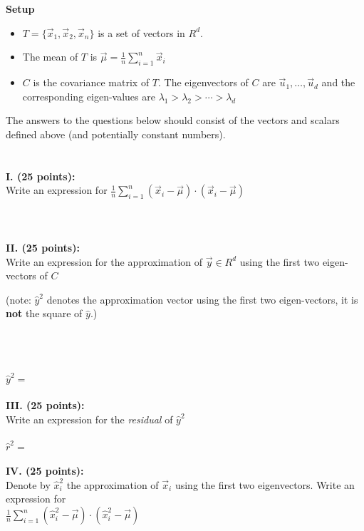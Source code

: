 \documentclass[10pt]{article}
\begin{document}
\newcommand{\uu}{\vec{u}}
\newcommand{\xx}{\vec{x}}
\newcommand{\yy}{\vec{y}}
\newcommand{\vmu}{\vec{\mu}}
~\\
~\\
\vspace{.1in}
\noindent
    {\bf Setup}
    \begin{itemize}
    \item $T=\{\xx_1,\xx_2,\xx_n\}$ is a set of vectors in $R^d$.
    \item The mean of $T$ is $\vmu = \frac{1}{n} \sum_{i=1}^n\xx_i$
    \item $C$ is the covariance matrix of $T$. The eigenvectors of $C$
      are $\uu_1,\ldots,\uu_d$ and the corresponding eigen-values are
      $\lambda_1 > \lambda_2 > \cdots > \lambda_d$
    \end{itemize}
    The answers to the questions below should consist of the vectors
    and scalars defined above (and potentially constant numbers).\\
    ~\\
    ~\\
\noindent
    {\bf I. (25 points):} \\
    Write an expression for $\frac{1}{n} \sum_{i=1}^n (\xx_i - \vmu)\cdot(\xx_i -
    \vmu)$ \\
~\\
~\\
\underline{\hspace{6in}}\\
\vspace{.1in}
\noindent
    {\bf II. (25 points):} \\
    Write an expression for the approximation of $\yy \in R^d$ using
    the first two eigen-vectors of $C$ \begin{small} (note: $\hat{y}^2$ denotes the
    approximation vector using the first two eigen-vectors, it is {\bf
      not} the square of $\hat{y}$.) \end{small} \\
~\\
~\\
\underline{$\hat{y}^2=$ \hspace{6in}}\\
~\\
\vspace{.1in}
\noindent
    {\bf III. (25 points):} \\
    Write an expression for the {\em residual} of $\hat{y}^2$
~\\
~\\
    \underline{$\hat{r}^2=$ \hspace{6in}}\\
~\\
\vspace{.1in}
\noindent
    {\bf IV. (25 points):} \\ Denote by $\hat{x}_i^2$ the
    approximation of $\xx_i$ using the first two eigenvectors. Write
    an expression for\\ $\frac{1}{n} \sum_{i=1}^n (\hat{x}_i^2 -
    \vmu)\cdot(\hat{x}_i^2  - \vmu)$
    ~\\
    ~\\
    \underline{\hspace{6in}}\\
\end{document}
